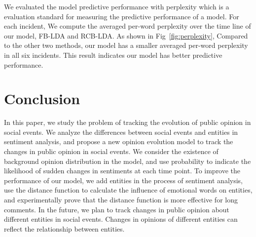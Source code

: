 \documentclass[runningheads]{llncs}
\begin{document}
We evaluated the model predictive performance with perplexity which is a evaluation standard for measuring the predictive performance of a model. For each incident, We compute the averaged per-word perplexity over the time line of our model, FB-LDA and RCB-LDA. As shown in Fig~\ref{fig:perplexity},  Compared to the other two methods, our model has a smaller averaged per-word perplexity in all six incidents. This result indicates our model has better predictive performance.







\section{Conclusion}\label{sec:conclusion}
In this paper, we study the problem of tracking the evolution of public opinion in social events. We analyze the differences between social events and entities in sentiment analysis, and propose a new opinion evolution model to track the changes in public opinion in social events. We consider the existence of background opinion distribution in the model, and use probability to indicate the likelihood of sudden changes in sentiments at each time point. To improve the performance of our model, we add entities in the process of sentiment analysis, use the distance function to calculate the influence of emotional words on entities, and experimentally prove that the distance function is more effective for long comments. In the future, we plan to track changes in public opinion about different entities in social events. Changes in opinions of different entities can reflect the relationship between entities.
\end{document}
